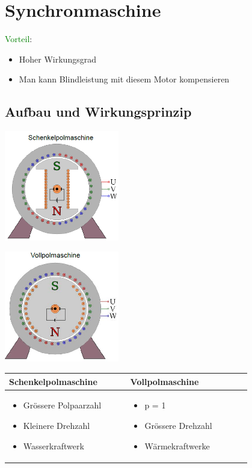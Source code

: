 \section{Synchronmaschine}

\textcolor{green}{Vorteil}:
\begin{itemize} 
    \item Hoher Wirkungsgrad
	\item Man kann Blindleistung mit diesem Motor kompensieren
\end{itemize}

\subsection{Aufbau und Wirkungsprinzip}
    \begin{minipage}[b]{0.5\linewidth}
    	\includegraphics[width = 5cm]{images/Schenkelpolmaschine}
    \end{minipage}
    \begin{minipage}[b]{0.5\linewidth}
    	\includegraphics[width = 5cm]{images/Vollpolmaschine}
    \end{minipage}
    \begin{tabular}[b]{| C{0.4\linewidth} | C{0.4\linewidth} |}
    	\hline
    	\textbf{Schenkelpolmaschine} &
        \textbf{Vollpolmaschine}
        \\ \hline
        
    	\vspace{-0.7cm}
    	\begin{itemize}
    		\item Grössere Polpaarzahl
    		\item Kleinere Drehzahl
    		\item Wasserkraftwerk
    	\end{itemize} &
        \vspace{-0.7cm}
        \begin{itemize}
        	\item p = 1
        	\item Grössere Drehzahl
        	\item Wärmekraftwerke
        \end{itemize}
        \\ \hline
    \end{tabular}
